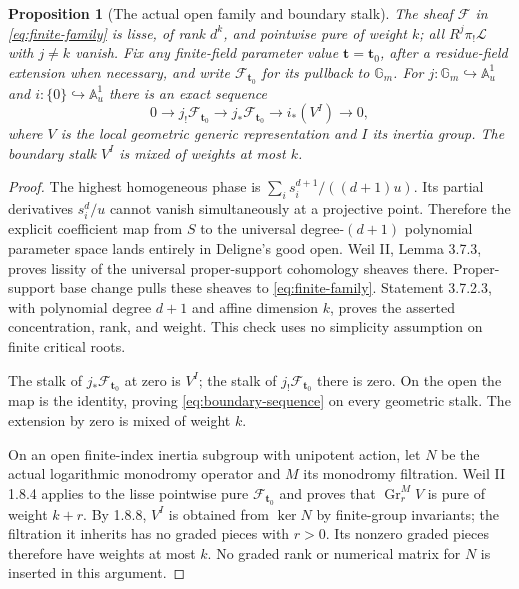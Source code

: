 \documentclass[11pt]{article}
\newtheorem{proposition}[theorem]{Proposition}
\newcommand{\A}{\mathbb A}
\newcommand{\Gm}{{\mathbb G_m}}
\begin{document}
\begin{proposition}[The actual open family and boundary stalk]
The sheaf $\mathcal F$ in \eqref{eq:finite-family} is lisse, of rank
$d^k$, and pointwise pure of weight $k$; all $R^j\pi_!\mathcal L$ with
$j\ne k$ vanish.  Fix any finite-field parameter value
$\mathbf t=\mathbf t_0$, after a residue-field extension when necessary,
and write $\mathcal F_{\mathbf t_0}$ for its pullback to $\Gm$.
For $j:\Gm\hookrightarrow\A^1_u$ and $i:\{0\}\hookrightarrow\A^1_u$
there is an exact sequence
\begin{equation}
 0\longrightarrow j_!\mathcal F_{\mathbf t_0}
  \longrightarrow j_*\mathcal F_{\mathbf t_0}
  \longrightarrow i_*(V^I)\longrightarrow0,                \label{eq:boundary-sequence}
\end{equation}
where $V$ is the local geometric generic representation and $I$ its
inertia group.  The boundary stalk $V^I$ is mixed of weights at most $k$.
\end{proposition}
\begin{proof}
The highest homogeneous phase is
$\sum_i s_i^{d+1}/((d+1)u)$.  Its partial derivatives $s_i^d/u$
cannot vanish simultaneously at a projective point.  Therefore the
explicit coefficient map from $S$ to the universal degree-$(d+1)$
polynomial parameter space lands entirely in Deligne's good open.
Weil II, Lemma 3.7.3, proves lissity of the universal proper-support
cohomology sheaves there.  Proper-support base change pulls these sheaves
to \eqref{eq:finite-family}.  Statement 3.7.2.3, with polynomial degree
$d+1$ and affine dimension $k$, proves the asserted concentration, rank,
and weight.  This check uses no simplicity assumption on finite critical
roots.

The stalk of $j_*\mathcal F_{\mathbf t_0}$ at zero is $V^I$; the stalk
of $j_!\mathcal F_{\mathbf t_0}$ there is zero.  On the open the map is
the identity, proving \eqref{eq:boundary-sequence} on every geometric
stalk.  The extension by zero is mixed of weight $k$.

On an open finite-index inertia subgroup with unipotent action, let $N$
be the actual logarithmic monodromy operator and $M$ its monodromy
filtration.  Weil II 1.8.4 applies to the lisse pointwise pure
$\mathcal F_{\mathbf t_0}$ and proves that
$\operatorname{Gr}_r^M V$ is pure of weight $k+r$.
By 1.8.8, $V^I$ is obtained from $\ker N$ by finite-group invariants;
the filtration it inherits has no graded pieces with $r>0$.
Its nonzero graded pieces therefore have weights at most $k$.
No graded rank or numerical matrix for $N$ is inserted in this argument.
\end{proof}
\end{document}
